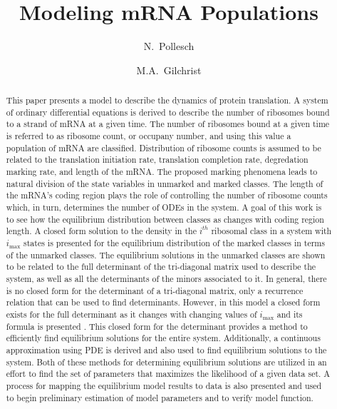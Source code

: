 \documentclass[review]{elsarticle}
\newcommand{\imax}{\ensuremath{i_{\max}}\xspace}
\begin{document}
\title{Modeling mRNA Populations}
\author[utkm,curradd]{N.~Pollesch}
\author[utkeeb,nimbios]{M.A.~Gilchrist}
\address[utkm]{Department of Mathematics, University of Tennessee,  Knoxville, TN 37996-1320}
\address[curradd]{Department of ??, Environmental Protection Agency, Duluth MN XXXXX}
\address[utkeeb]{Department of Ecology and Evolutionary Biology, University of Tennessee, Knoxville, TN 37996-1610}
\address[nimbios]{National Institute for Mathematical and Biological Synthesis, University of Tennessee, Knoxville, TN 37996-3410}

\begin{abstract}
This paper presents a model to describe the dynamics of protein translation.  
A system of ordinary differential equations is derived to describe the number of ribosomes bound to a strand of mRNA at a given time.
The number of ribosomes bound at a given time is referred to as ribosome count, or occupany number, and using this value a population of mRNA are classified.  
Distribution of ribosome counts is assumed to be related to the translation initiation rate, translation completion rate, degredation marking rate, and length of the mRNA.
The proposed marking phenomena leads to natural division of the state variables in unmarked and marked classes.
The length of the mRNA's coding region plays the role of controlling the number of ribosome counts which, in turn, determines the number of ODEs in the system.  
A goal of this work is to see how the equilibrium distribution between classes as changes with coding region length.
A closed form solution to the density in the $i^{th}$ ribosomal class in a system with \imax states is presented for the equilibrium distribution of the marked classes in terms of the unmarked classes.
The equilibrium solutions in the unmarked classes are shown to be related to the full determinant of the tri-diagonal matrix used to describe the system, as well as all the determinants of the minors associated to it.
In general, there is no closed form for the determinant of a tri-diagonal matrix, only a recurrence relation that can be used to find determinants.
However, in this model a closed form exists for the full determinant as it changes with changing values of \imax and its formula is presented .
This closed form for the determinant provides a method to efficiently find equilibrium solutions for the entire system.
Additionally, a continuous approximation using PDE is derived and also used to find equilibrium solutions to the system.
Both of these methods for determining equilibrium solutions are utilized in an effort to find the set of parameters that maximizes the likelihood of a given data set.
A process for mapping the equilibrium model results to data is also presented and used to begin preliminary estimation of model parameters and to verify model function.
 

\end{abstract}
\end{document}
